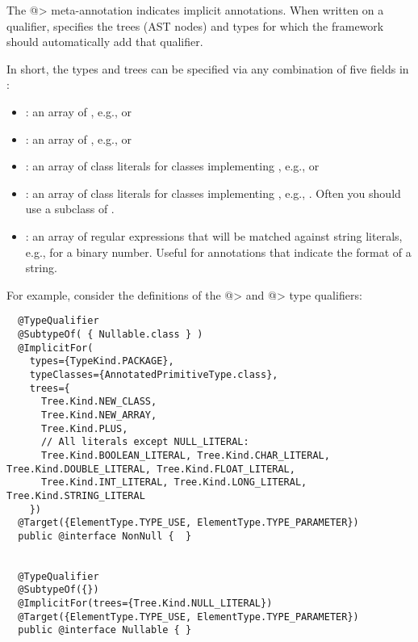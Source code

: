 The \<@> meta-annotation indicates implicit annotations.
When written on a qualifier, 
specifies the trees (AST nodes) and types for which the framework should
automatically add that qualifier.

In short, the types and trees can be
specified via any combination of five fields in :

  \begin{itemize}
  \item {}: an array of
    , e.g.,
     or 
  \item {}: an array of
    , e.g., 
    or 
  \item {}: an array of class literals for classes
    implementing , e.g.,
     or 
  \item {}: an array of class literals for classes
    implementing , e.g.,
    .  Often you should use
    a subclass of .
  \item {}: an array of regular expressions that will
    be matched against
    string literals, e.g.,  for a binary number.  Useful
    for annotations that indicate the format of a string.
  \end{itemize}

For example, consider the definitions of the \<@> and \<@>
type qualifiers:

\begin{smaller}
\begin{Verbatim}
  @TypeQualifier
  @SubtypeOf( { Nullable.class } )
  @ImplicitFor(
    types={TypeKind.PACKAGE},
    typeClasses={AnnotatedPrimitiveType.class},
    trees={
      Tree.Kind.NEW_CLASS,
      Tree.Kind.NEW_ARRAY,
      Tree.Kind.PLUS,
      // All literals except NULL_LITERAL:
      Tree.Kind.BOOLEAN_LITERAL, Tree.Kind.CHAR_LITERAL, Tree.Kind.DOUBLE_LITERAL, Tree.Kind.FLOAT_LITERAL,
      Tree.Kind.INT_LITERAL, Tree.Kind.LONG_LITERAL, Tree.Kind.STRING_LITERAL
    })
  @Target({ElementType.TYPE_USE, ElementType.TYPE_PARAMETER})
  public @interface NonNull {  }


  @TypeQualifier
  @SubtypeOf({})
  @ImplicitFor(trees={Tree.Kind.NULL_LITERAL})
  @Target({ElementType.TYPE_USE, ElementType.TYPE_PARAMETER})
  public @interface Nullable { }
\end{Verbatim}
\end{smaller}


